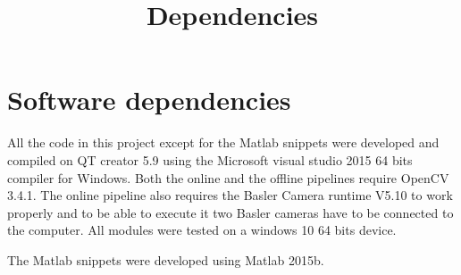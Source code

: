 \documentclass[]{article}
\title{Dependencies}
\author{}
\begin{document}
\maketitle


\section{Software dependencies}

All the code in this project except for the Matlab snippets were developed and compiled on QT creator 5.9 using the Microsoft visual studio 2015 64 bits compiler for Windows. Both the online and the offline pipelines require OpenCV 3.4.1. The online pipeline also requires the Basler Camera runtime V5.10 to work properly and to be able to execute it two Basler cameras have to be connected to the computer. All modules were tested on a windows 10 64 bits device.

The Matlab snippets were developed using Matlab 2015b.
\end{document}
